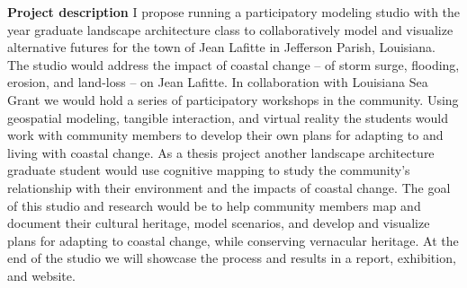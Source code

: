 \documentclass[11pt,article,oneside]{memoir}
\begin{document}


\noindent \textbf{Project description}
I propose running a participatory modeling studio 
with the  year graduate landscape architecture class
to collaboratively model and visualize alternative futures 
for the town of Jean Lafitte in Jefferson Parish, Louisiana.   
%
The studio would address 
the impact of coastal change 
-- of storm surge, flooding, erosion, and land-loss --
on Jean Lafitte.
%
In collaboration with Louisiana Sea Grant 
we would hold a series of participatory workshops 
in the community.
%
Using geospatial modeling, tangible interaction, and virtual reality
the students would work with community members to develop 
their own plans for adapting to and living with coastal change.
%
As a thesis project
another landscape architecture graduate student
would use cognitive mapping 
to study the community's relationship with their environment
and the impacts of coastal change.
%
The goal of this studio and research 
would be to help community members 
map and document their cultural heritage,
model scenarios,
and develop and visualize plans
for adapting to coastal change, 
while conserving vernacular heritage. 
%
At the end of the studio we will showcase 
the process and results in a report, exhibition, 
and website. \\
\end{document}
